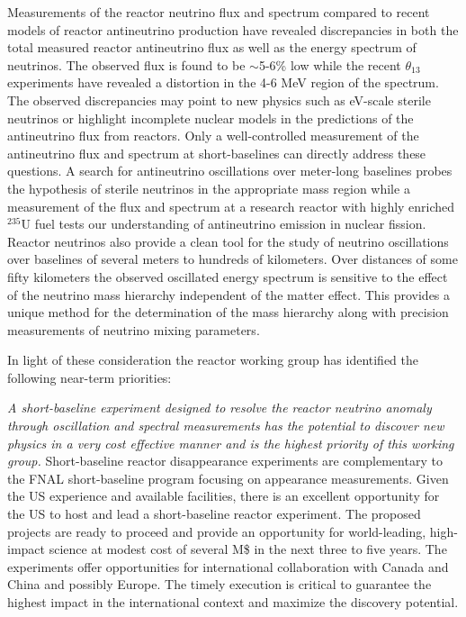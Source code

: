 Measurements of the reactor neutrino flux and spectrum compared to recent models of reactor antineutrino production have revealed discrepancies in both the total measured reactor antineutrino flux as well as the energy spectrum of neutrinos. The observed flux is found to be $\sim$5-6\% low while the recent $\theta_{13}$ experiments have revealed a distortion in the 4-6 MeV region of the spectrum.  The observed discrepancies may point to new physics such as eV-scale sterile neutrinos
or highlight incomplete nuclear models in the predictions of the antineutrino flux from reactors. Only a well-controlled measurement of the antineutrino flux and spectrum at short-baselines can directly  address these questions. A search for antineutrino oscillations over meter-long baselines probes  the hypothesis of sterile neutrinos in the appropriate mass region while a measurement of the flux and  spectrum at a research reactor with highly enriched $^{235}$U fuel tests our understanding of antineutrino emission in nuclear fission. Reactor neutrinos also provide a clean tool for the study of neutrino oscillations over baselines of several meters to hundreds of kilometers. Over distances of some fifty kilometers the observed oscillated energy spectrum is sensitive to the effect of the neutrino mass hierarchy independent of the matter effect. This provides a unique method for the determination of the mass hierarchy along with precision measurements of neutrino mixing parameters.

In light of these consideration the reactor working group has identified the following near-term priorities:

{\em A short-baseline experiment designed to resolve the reactor neutrino anomaly through oscillation 
and spectral measurements has the potential to discover new physics in a very cost effective manner and is the highest priority of this working group.}  Short-baseline reactor disappearance experiments are complementary to the FNAL short-baseline program focusing on appearance measurements. Given the US experience and available facilities, there is an excellent opportunity for the US to host and lead a short-baseline reactor experiment. The proposed projects are ready to proceed and provide an opportunity for world-leading, high-impact science at modest cost of several M\$ in the next three to five years. The experiments offer opportunities for international collaboration with Canada and China and possibly Europe. The timely execution is critical to guarantee the highest impact in the international context and maximize the discovery potential. 


